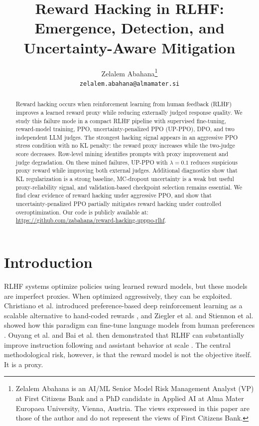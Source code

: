\documentclass[twocolumn,10pt]{article}
\title{Reward Hacking in RLHF:\\Emergence, Detection, and Uncertainty-Aware Mitigation}
\author{Zelalem Abahana\thanks{Zelalem Abahana is an AI/ML Senior Model Risk Management Analyst (VP) at First Citizens Bank and a PhD candidate in Applied AI at Alma Mater Europaea University, Vienna, Austria. The views expressed in this paper are those of the author and do not represent the views of First Citizens Bank.}\\\texttt{zelalem.abahana@almamater.si}}
\begin{document}
\maketitle
\thispagestyle{plain}
\pagestyle{plain}
\begin{abstract}
Reward hacking occurs when reinforcement learning from human feedback (RLHF) improves a learned reward proxy while reducing externally judged response quality. We study this failure mode in a compact RLHF pipeline with supervised fine-tuning, reward-model training, PPO, uncertainty-penalized PPO (UP-PPO), DPO, and two independent LLM judges. The strongest hacking signal appears in an aggressive PPO stress condition with no KL penalty: the reward proxy increases while the two-judge score decreases. Row-level mining identifies prompts with proxy improvement and judge degradation. On these mined failures, UP-PPO with $\lambda=0.1$ reduces suspicious proxy reward while improving both external judges. Additional diagnostics show that KL regularization is a strong baseline, MC-dropout uncertainty is a weak but useful proxy-reliability signal, and validation-based checkpoint selection remains essential. We find clear evidence of reward hacking under aggressive PPO, and show that uncertainty-penalized PPO partially mitigates reward hacking under controlled overoptimization. Our code is publicly available at: \url{https://github.com/zabahana/reward-hacking-upppo-rlhf}.
\end{abstract}
\par\smallskip{}\par\vspace{0.75em}



\section{Introduction}
RLHF systems optimize policies using learned reward models, but these models are imperfect proxies. When optimized aggressively, they can be exploited. Christiano et al. introduced preference-based deep reinforcement learning as a scalable alternative to hand-coded rewards \cite{christiano2017deep}, and Ziegler et al. and Stiennon et al. showed how this paradigm can fine-tune language models from human preferences \cite{ziegler2019fine,stiennon2020learning}. Ouyang et al. and Bai et al. then demonstrated that RLHF can substantially improve instruction following and assistant behavior at scale \cite{ouyang2022training,bai2022training}. The central methodological risk, however, is that the reward model is not the objective itself. It is a proxy.
\end{document}
